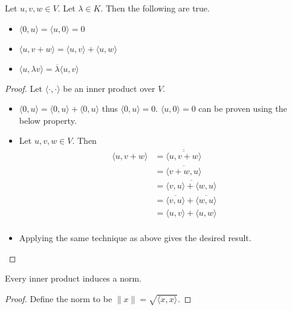 \begin{prp}{}{} Let $u,v,w\in V$. Let $\lambda\in K$. Then the following are true. 
\begin{itemize}
\item $\langle 0,u\rangle=\langle u,0\rangle=0$
\item $\langle u,v+w\rangle=\langle u,v\rangle+\langle u,w\rangle$
\item $\langle u,\lambda v\rangle=\overline{\lambda}\langle u,v\rangle$
\end{itemize}\tcbline
\begin{proof} Let $\langle \cdot,\cdot\rangle$ be an inner product over $V$. 
\begin{itemize}
\item $\langle 0,u\rangle=\langle 0,u\rangle+\langle 0,u\rangle$ thus $\langle 0,u\rangle=0$. $\langle u,0\rangle=0$ can be proven using the below property. 
\item Let $u,v,w\in V$. Then 
\begin{align*}
\langle u,v+w\rangle&=\overline{\overline{\langle u,v+w\rangle}}\\
&=\overline{\langle v+w,u\rangle}\\
&=\overline{\langle v,u\rangle+\langle w,u\rangle}\\
&=\overline{\langle v,u\rangle}+\overline{\langle w,u\rangle}\\
&=\langle u,v\rangle+\langle u,w\rangle\\
\end{align*}
\item Applying the same technique as above gives the desired result. 
\end{itemize}
\end{proof}
\end{prp}

\begin{prp}{}{} Every inner product induces a norm. \tcbline
\begin{proof} Define the norm to be $\|x\|=\sqrt{\langle x,x\rangle}$. 
\end{proof}
\end{prp}

